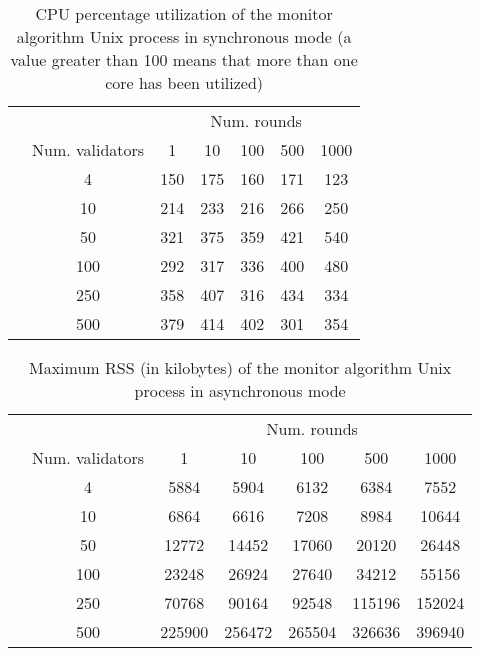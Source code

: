 \documentclass[a4paper,11pt,oneside]{report}
\begin{document}
\begin{table}[]
\centering
\begin{tabular}{l|c|c|c|c|c|c|}
\cline{2-7}
                  &  & \multicolumn{5}{c|}{Num. rounds} \\ \cline{2-7} 
\multirow{7}{*}{} & Num. validators & 1   & 10   & 100  & 500  & 1000  \\ \cline{2-7} 
                  & 4               & 150  & 175  & 160 & 171 & 123      \\ \cline{2-7} 
                  & 10              & 214    & 233     &  216   & 266  & 250      \\ \cline{2-7} 
                  & 50              & 321    & 375    & 359     &  421    &  540     \\ \cline{2-7} 
                  & 100             & 292  & 317    & 336  & 400     & 480      \\ \cline{2-7} 
                  & 250             &  358   & 407     &  316    &  434    &  334     \\ \cline{2-7} 
                  & 500             & 379    & 414     &  402    &  301    & 354      \\ \cline{2-7} 
\end{tabular}
\caption{CPU percentage utilization of the monitor algorithm Unix process in synchronous mode (a value greater than 100 means that more than one core has been utilized)}
\end{table}

\begin{table}[]
\centering
\begin{tabular}{l|c|c|c|c|c|c|}
\cline{2-7}
                  &  & \multicolumn{5}{c|}{Num. rounds} \\ \cline{2-7} 
\multirow{7}{*}{} & Num. validators & 1   & 10   & 100  & 500  & 1000  \\ \cline{2-7} 
                  & 4               & 5884 & 5904  & 6132 & 6384  & 7552       \\ \cline{2-7} 
                  & 10              & 6864   & 6616   & 7208  & 8984  &  10644     \\ \cline{2-7} 
                  & 50              & 12772    & 14452     & 17060      &  20120    & 26448      \\ \cline{2-7} 
                  & 100             & 23248    & 26924     & 27640     & 34212     &   55156    \\ \cline{2-7} 
                  & 250             & 70768    &  90164    & 92548     & 115196      & 152024      \\ \cline{2-7} 
                  & 500             &  225900   &  256472    & 265504     &  326636    &  396940     \\ \cline{2-7} 
\end{tabular}
\caption{Maximum RSS (in kilobytes) of the monitor algorithm Unix process in asynchronous mode}
\end{table}
\end{document}
